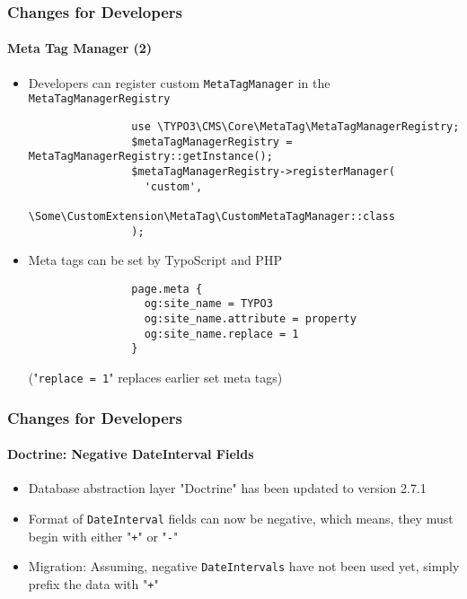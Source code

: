 \begin{frame}[fragile]
	\frametitle{Changes for Developers}
	\framesubtitle{Meta Tag Manager (2)}

	\lstset{basicstyle=\tiny\ttfamily}

	\begin{itemize}
		\item Developers can register custom \texttt{MetaTagManager} in the
			\texttt{MetaTagManagerRegistry}

			\begin{lstlisting}
				use \TYPO3\CMS\Core\MetaTag\MetaTagManagerRegistry;
				$metaTagManagerRegistry = MetaTagManagerRegistry::getInstance();
				$metaTagManagerRegistry->registerManager(
				  'custom',
				  \Some\CustomExtension\MetaTag\CustomMetaTagManager::class
				);
			\end{lstlisting}

		\item Meta tags can be set by TypoScript and PHP

			\begin{lstlisting}
				page.meta {
				  og:site_name = TYPO3
				  og:site_name.attribute = property
				  og:site_name.replace = 1
				}
			\end{lstlisting}

			\smaller
				("\texttt{replace = 1}" replaces earlier set meta tags)
			\normalsize

	\end{itemize}

\end{frame}


\begin{frame}[fragile]
	\frametitle{Changes for Developers}
	\framesubtitle{Doctrine: Negative DateInterval Fields}

	\begin{itemize}
		\item Database abstraction layer "Doctrine" has been updated to version 2.7.1
		\item Format of \texttt{DateInterval} fields can now be negative, which
			means, they must begin with either "\texttt{+}" or "\texttt{-}"
		\item Migration: Assuming, negative \texttt{DateIntervals} have not been used yet,
			simply prefix the data with "\texttt{+}"
	\end{itemize}

	\breakingchange

\end{frame}

